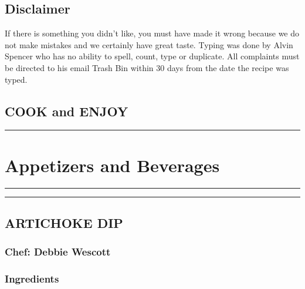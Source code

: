 \documentclass[
]{book}
\begin{document}
\hypertarget{disclaimer}{%
\section*{Disclaimer}\label{disclaimer}}


If there is something you didn't like, you must have made it wrong because we do not make mistakes and we certainly have great taste. Typing was done by Alvin Spencer who has no ability to spell, count, type or duplicate. All complaints must be directed to his email Trash Bin within 30 days from the date the recipe was typed.

\hypertarget{cook-and-enjoy}{%
\section*{COOK and ENJOY}\label{cook-and-enjoy}}


\begin{center}\rule{0.5\linewidth}{0.5pt}\end{center}

\hypertarget{appetizers}{%
\chapter{Appetizers and Beverages}\label{appetizers}}

\begin{center}\rule{0.5\linewidth}{0.5pt}\end{center}

\begin{center}\rule{0.5\linewidth}{0.5pt}\end{center}

\hypertarget{artichoke-dip}{%
\section*{ARTICHOKE DIP}\label{artichoke-dip}}


\hypertarget{chef-debbie-wescott}{%
\subsection*{Chef: Debbie Wescott}\label{chef-debbie-wescott}}


\hypertarget{ingredients}{%
\subsection*{Ingredients}\label{ingredients}}
\end{document}
